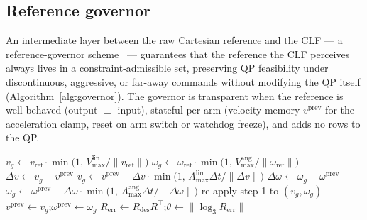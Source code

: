 \documentclass[12pt,a4paper,twoside,openright]{report}
\begin{document}
\subsection{Reference governor}
\label{sec:governor}

An intermediate layer between the raw Cartesian reference and the CLF --- a reference-governor scheme~\cite{garone2017} --- guarantees that the reference the CLF perceives always lives in a constraint-admissible set, preserving QP feasibility under discontinuous, aggressive, or far-away commands without modifying the QP itself (Algorithm~\ref{alg:governor}). The governor is transparent when the reference is well-behaved (output $\equiv$ input), stateful per arm (velocity memory $v^{\text{prev}}$ for the acceleration clamp, reset on arm switch or watchdog freeze), and adds no rows to the QP.

\begin{algorithm}[t]
\caption{Reference governor (one arm, one control tick).}
\label{alg:governor}
\small
{}
$v_g \leftarrow v_{\text{ref}}\cdot\min\bigl(1,\, V_{\max}^{\text{lin}}/\|v_{\text{ref}}\|\bigr)$\;
$\omega_g \leftarrow \omega_{\text{ref}}\cdot\min\bigl(1,\, V_{\max}^{\text{ang}}/\|\omega_{\text{ref}}\|\bigr)$\;
$\Delta v \leftarrow v_g - v^{\text{prev}}$\;
$v_g \leftarrow v^{\text{prev}} + \Delta v \cdot \min\bigl(1,\, A_{\max}^{\text{lin}}\Delta t/\|\Delta v\|\bigr)$\;
$\Delta \omega \leftarrow \omega_g - \omega^{\text{prev}}$\;
$\omega_g \leftarrow \omega^{\text{prev}} + \Delta \omega \cdot \min\bigl(1,\, A_{\max}^{\text{ang}}\Delta t/\|\Delta \omega\|\bigr)$\;
re-apply step 1 to $(v_g, \omega_g)$\;
$v^{\text{prev}} \leftarrow v_g$;\quad $\omega^{\text{prev}} \leftarrow \omega_g$\;
$R_{\text{err}} \leftarrow R_{\text{des}}R^{\top}$;\quad $\theta \leftarrow \|\log_3 R_{\text{err}}\|$\;
\end{algorithm}
\end{document}
